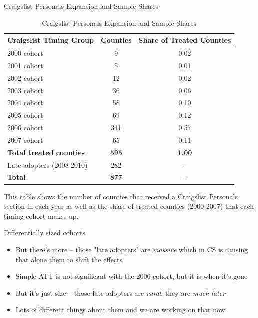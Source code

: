 \documentclass{beamer}
\begin{document}
\begin{frame}[shrink=20]{Craigslist Personals Expansion and Sample Shares}
\begin{table}[htbp]\centering
\footnotesize
\caption{Craigslist Personals Expansion and Sample Shares}
\label{tab:table1}
\begin{threeparttable}
\begin{tabular}{lcc}
\toprule
\textbf{Craigslist Timing Group} & \textbf{Counties} & \textbf{Share of Treated Counties} \\
\midrule
2000 cohort & 9 & 0.02 \\
2001 cohort & 5 & 0.01 \\
2002 cohort & 12 & 0.02 \\
2003 cohort & 36 & 0.06 \\
2004 cohort & 58 & 0.10 \\
2005 cohort & 69 & 0.12 \\
2006 cohort & 341 & 0.57 \\
2007 cohort & 65 & 0.11 \\
\midrule
\textbf{Total treated counties} & \textbf{595} & \textbf{1.00} \\
\midrule
Late adopters (2008-2010) & 282 & -- \\
\midrule
\textbf{Total} & \textbf{877} & \textbf{--} \\
\bottomrule
\end{tabular}
\begin{tablenotes}
\footnotesize
\item This table shows the number of counties that received a Craigslist Personals section in each year as well as the share of treated counties (2000-2007) that each timing cohort makes up.
\end{tablenotes}
\end{threeparttable}
\end{table}
\end{frame}

\begin{frame}{Differentially sized cohorts}

\begin{itemize}
\item But there's more -- those "late adopters" are \emph{massive} which in CS is causing that alone them to shift the effects
\item Simple ATT is not significant with the 2006 cohort, but it is when it's gone
\item But it's just size -- those late adopters are \emph{rural}, they are \emph{much later}
\item Lots of different things about them and we are working on that now
\end{itemize}

\end{frame}
\end{document}
